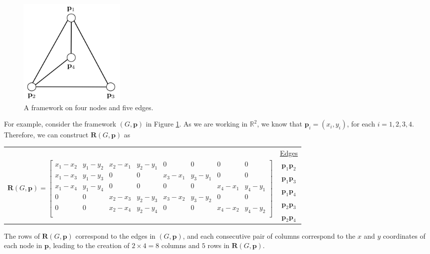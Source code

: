 \begin{figure}[htbp]
    \centering
    \includegraphics[width = 0.25\textwidth]{Chapter 3/4. rigidity_matrix.png}
    \caption{A framework on four nodes and five edges.}
    \label{fig: rigidity_matrix}
\end{figure}
\vspace{-3 mm}
\begin{flushleft}
For example, consider the framework $(G,\mathbf{p})$ in Figure \ref{fig: rigidity_matrix}. As we are working in $\mathbb{R}^2$, we know that $\mathbf{p}_i = (x_{i}, y_{i})$, for each $i = 1,2,3,4$. Therefore, we can construct $\mathbf{R}(G,\mathbf{p})$ as
\end{flushleft}
\vspace{-6 mm}
\begin{center}
\begin{tabular}{ c c } 
 & \underline{Edges} \\
\multirow{5}{15 cm}{$
    \mathbf{R}(G,\mathbf{p}) = 
    \begin{bmatrix}
    x_1 - x_2 & y_1 - y_2 & x_2 - x_1 & y_2 - y_1 & 0 & 0 & 0 & 0 \\ %
    x_1 - x_3 & y_1 - y_3 & 0 & 0 & x_3 - x_1 & y_3 - y_1 & 0 & 0 \\ %
    x_1 - x_4 & y_1 - y_4 & 0 & 0 & 0 & 0 & x_4 - x_1 & y_4 - y_1 \\ %
    0 & 0 & x_2 - x_3 & y_2 - y_3 & x_3 - x_2 & y_3 - y_2 & 0 & 0 \\ %
    0 & 0 & x_2 - x_4 & y_2 - y_4 & 0 & 0 & x_4 - x_2 & y_4 - y_2 \\ %
    \end{bmatrix}$} & $\mathbf{p}_1\mathbf{p}_2$ \\
    & $\mathbf{p}_1\mathbf{p}_3$ \\
    & $\mathbf{p}_1\mathbf{p}_4$ \\
    & $\mathbf{p}_2\mathbf{p}_3$ \\
    & $\mathbf{p}_2\mathbf{p}_4$ \\    
\end{tabular}
\end{center}
\vspace{0.5 mm}
\begin{flushleft}
The rows of $\mathbf{R}(G,\mathbf{p})$ correspond to the edges in $(G,\mathbf{p})$, and each consecutive pair of columns correspond to the $x$ and $y$ coordinates of each node in $\mathbf{p}$, leading to the creation of $2 \times 4 = 8$ columns and $5$ rows in $\mathbf{R}(G,\mathbf{p})$.
\end{flushleft}

